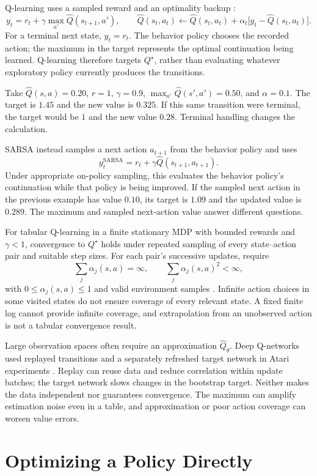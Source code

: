 Q-learning uses a sampled reward and an optimality backup \citep{watkins1992}:
\[
y_t=r_t+\gamma\max_{a'}\hat Q(s_{t+1},a'),
\qquad
\hat Q(s_t,a_t)\leftarrow
\hat Q(s_t,a_t)+\alpha_t\bigl[y_t-\hat Q(s_t,a_t)\bigr].
\]
For a terminal next state, $y_t=r_t$. The behavior policy chooses the recorded action; the maximum in the target represents the optimal continuation being learned. Q-learning therefore targets $Q^\star$, rather than evaluating whatever exploratory policy currently produces the transitions.

Take $\hat Q(s,a)=0.20$, $r=1$, $\gamma=0.9$, $\max_{a'}\hat Q(s',a')=0.50$, and $\alpha=0.1$. The target is $1.45$ and the new value is $0.325$. If this same transition were terminal, the target would be $1$ and the new value $0.28$. Terminal handling changes the calculation.

SARSA instead samples a next action $a_{t+1}$ from the behavior policy and uses
\[
y_t^{\mathrm{SARSA}}
=r_t+\gamma\hat Q(s_{t+1},a_{t+1}).
\]
Under appropriate on-policy sampling, this evaluates the behavior policy's continuation while that policy is being improved. If the sampled next action in the previous example has value $0.10$, its target is $1.09$ and the updated value is $0.289$. The maximum and sampled next-action value answer different questions.

For tabular Q-learning in a finite stationary MDP with bounded rewards and $\gamma<1$, convergence to $Q^\star$ holds under repeated sampling of every state--action pair and suitable step sizes. For each pair's successive updates, require
\[
\sum_j\alpha_j(s,a)=\infty,
\qquad
\sum_j\alpha_j(s,a)^2<\infty,
\]
with $0\le\alpha_j(s,a)\le1$ and valid environment samples \citep{watkins1992}. Infinite action choices in some visited states do not ensure coverage of every relevant state. A fixed finite log cannot provide infinite coverage, and extrapolation from an unobserved action is not a tabular convergence result.

Large observation spaces often require an approximation $\hat Q_\theta$. Deep Q-networks used replayed transitions and a separately refreshed target network in Atari experiments \citep{mnih2015}. Replay can reuse data and reduce correlation within update batches; the target network slows changes in the bootstrap target. Neither makes the data independent nor guarantees convergence. The maximum can amplify estimation noise even in a table, and approximation or poor action coverage can worsen value errors.

\section{Optimizing a Policy Directly}

